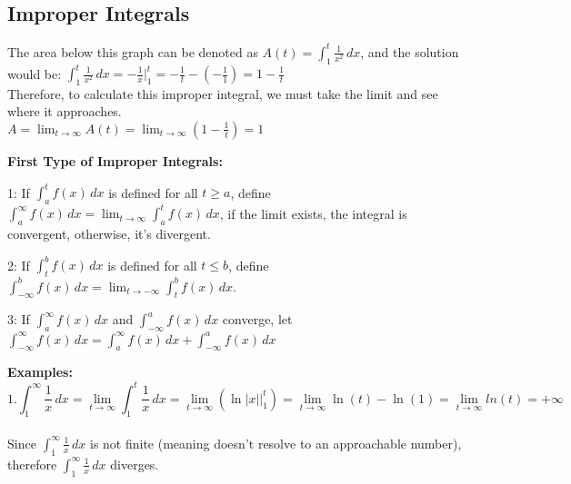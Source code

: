 \documentclass[12pt, letterpaper]{article}
\begin{document}
    \subsection*{Improper Integrals}
    \begin{flushleft}
        The area below this graph can be denoted as $A(t)=\int_1^t\frac{1}{x^2}\,dx$, and the solution would be: $\int_1^t\frac{1}{x^2}\,dx=-\frac{1}{x}\big|_1^t=-\frac{1}{t}-(-\frac{1}{1})=1-\frac{1}{t}$\\
        Therefore, to calculate this improper integral, we must take the limit and see where it approaches.\\
        $A=\lim_{t \to \infty}A(t)=\lim_{t \to \infty}(1-\frac{1}{t})=1$\\
    \end{flushleft}
    \newpage
    \begin{flushleft}\textbf{First Type of Improper Integrals:}\end{flushleft}
    \begin{description}
        \item 1: If $\int_a^tf(x)\,dx$ is defined for all $t\geq a$, define\\$\int_a^\infty f(x)\,dx=\lim_{t \to \infty}\int_a^tf(x)\,dx$, if the limit exists, the integral is convergent, otherwise, it's divergent.
        \item 2: If $\int_t^bf(x)\,dx$ is defined for all $t\leq b$, define\\$\int_{-\infty}^bf(x)\,dx=\lim_{t \to -\infty}\int_t^bf(x)\,dx$.
        \item 3: If $\int_a^\infty f(x)\,dx$ and $\int_{-\infty}^af(x)\,dx$ converge, let\\$\int_{-\infty}^\infty f(x)\,dx=\int_a^\infty f(x)\,dx+\int_{-\infty}^af(x)\,dx$
    \end{description}
    \begin{flushleft}
        \textbf{Examples:}\\
        $$1. \int_1^\infty\frac{1}{x}\,dx=\lim_{t \to \infty}\int_1^t\frac{1}{x}\,dx=\lim_{t \to \infty}(\ln|x|\big|_1^t)=\lim_{t \to \infty}\ln(t)-\ln(1)=\lim_{t \to \infty}ln(t)=+\infty$$\\
        Since $\int_1^\infty \frac{1}{x}\,dx$ is not finite (meaning doesn't resolve to an approachable number), therefore $\int_1^\infty \frac{1}{x}\,dx$ diverges.
    \end{flushleft}
\end{document}

